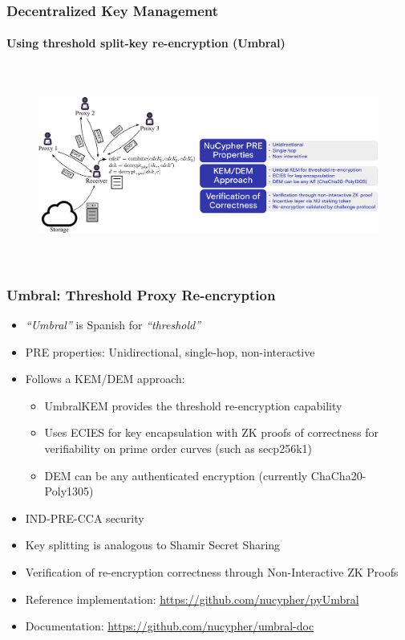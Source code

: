 \documentclass[xetex,mathsans,sans,aspectratio=169]{beamer}
\begin{document}
    \begin{frame}
        \frametitle{Decentralized Key Management}
        \framesubtitle{Using threshold split-key re-encryption (Umbral)}
        \begin{figure}
            \centering
            \includegraphics[height=6.5cm]{pdf/decrypt-umbral.pdf}
        \end{figure}
    \end{frame}

    \begin{frame}
        \frametitle{Umbral: Threshold Proxy Re-encryption}
        \begin{itemize}
        	\item \emph{``Umbral''} is Spanish for \emph{``threshold''}
            \item PRE properties: Unidirectional, single-hop, non-interactive
            \item Follows a KEM/DEM approach:
            	\begin{itemize}
		    \item UmbralKEM provides the threshold re-encryption capability
                    \item Uses ECIES for key encapsulation with ZK proofs of correctness for verifiability on prime order curves (such as secp256k1)
            	    \item DEM can be any authenticated encryption (currently ChaCha20-Poly1305)
        	\end{itemize}
	    \item IND-PRE-CCA security
            \item Key splitting is analogous to Shamir Secret Sharing
	    \item Verification of re-encryption correctness through Non-Interactive ZK Proofs
            \item Reference implementation: \url{https://github.com/nucypher/pyUmbral}
	    \item Documentation: \url{https://github.com/nucypher/umbral-doc}
        \end{itemize}
    \end{frame}
\end{document}
